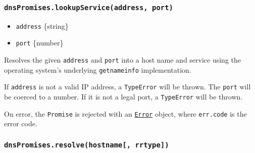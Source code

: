 \subsubsection{\texorpdfstring{\texttt{dnsPromises.lookupService(address,\ port)}}{dnsPromises.lookupService(address, port)}}\label{dnspromises.lookupserviceaddress-port}

\begin{itemize}
\tightlist
\item
  \texttt{address} \{string\}
\item
  \texttt{port} \{number\}
\end{itemize}

Resolves the given \texttt{address} and \texttt{port} into a host name
and service using the operating system's underlying \texttt{getnameinfo}
implementation.

If \texttt{address} is not a valid IP address, a \texttt{TypeError} will
be thrown. The \texttt{port} will be coerced to a number. If it is not a
legal port, a \texttt{TypeError} will be thrown.

On error, the \texttt{Promise} is rejected with an
\href{errors.md\#class-error}{\texttt{Error}} object, where
\texttt{err.code} is the error code.

\begin{Shaded}
\begin{Highlighting}[]
\OperatorTok{=} \NormalTok{(}\NormalTok{)}\OperatorTok{;}
\NormalTok{(}\OperatorTok{,} \NormalTok{)}\KeywordTok{=\textgreater{}}\NormalTok{ \{}
  \OperatorTok{,}\NormalTok{)}\OperatorTok{;}
\NormalTok{\})}\OperatorTok{;}
\end{Highlighting}
\end{Shaded}

\subsubsection{\texorpdfstring{\texttt{dnsPromises.resolve(hostname{[},\ rrtype{]})}}{dnsPromises.resolve(hostname{[}, rrtype{]})}}\label{dnspromises.resolvehostname-rrtype}

